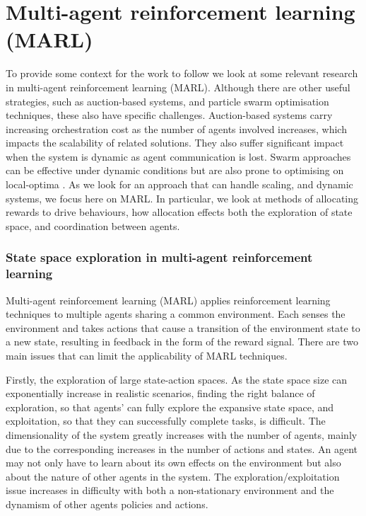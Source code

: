 \section{Multi-agent reinforcement learning (MARL)}
\label{section:local_neighbourhoods:background}
To provide some context for the work to follow we look at some relevant research in multi-agent reinforcement learning (MARL). Although there are other useful strategies, such as auction-based systems, and particle swarm optimisation techniques, these also have specific challenges. Auction-based systems carry increasing orchestration cost as the number of agents involved increases, which impacts the scalability of related solutions. They also suffer significant impact when the system is dynamic as agent communication is lost. Swarm approaches can be effective under dynamic conditions but are also prone to optimising on local-optima \cite{Singhal2015}. As we look for an approach that can handle scaling, and dynamic systems, we focus here on MARL. In particular, we look at methods of allocating rewards to drive behaviours, how allocation effects both the exploration of state space, and coordination between agents. 

\subsubsection*{State space exploration in multi-agent reinforcement learning}
\label{section:background:marl}
Multi-agent reinforcement learning (MARL) \cite{Busoniu2008a,Busoniu2010,Tuyls2012} applies reinforcement learning techniques to multiple agents sharing a common environment. Each senses the environment and takes actions that cause a transition of the environment state to a new state, resulting in feedback in the form of the reward signal. There are two main issues that can limit the applicability of MARL techniques. 

Firstly, the exploration of large state-action spaces. As the state space size can exponentially increase in realistic scenarios, finding the right balance of exploration, so that agents' can fully explore the expansive state space, and exploitation, so that they can successfully complete tasks, is difficult. The dimensionality of the system greatly increases with the number of agents, mainly due to the corresponding increases in the number of actions and states. An agent may not only have to learn about its own effects on the environment but also about the nature of other agents in the system. The exploration/exploitation issue increases in difficulty with both a non-stationary environment and the dynamism of other agents policies and actions. 

